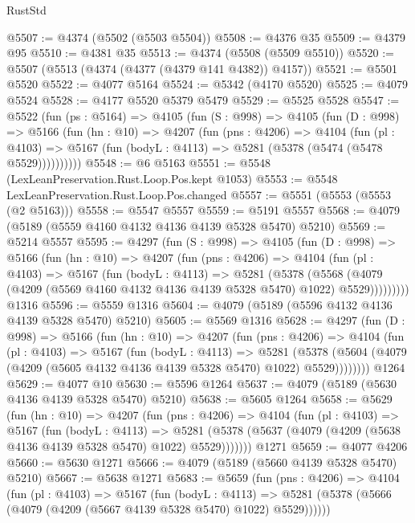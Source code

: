 \begin{lexlean}{RustStd}
\begin{coremodule}
@5507 := @4374 (@5502 (@5503 @5504))
@5508 := @4376 @35
@5509 := @4379 @95
@5510 := @4381 @35
@5513 := @4374 (@5508 (@5509 @5510))
@5520 := @5507 (@5513 (@4374 (@4377 (@4379 @141 @4382)) @4157))
@5521 := @5501 @5520
@5522 := @4077 @5164
@5524 := @5342 (@4170 @5520)
@5525 := @4079 @5524
@5528 := @4177 @5520 @5379 @5479
@5529 := @5525 @5528
@5547 := @5522
    (fun (ps : @5164) =>
    @4105
      (fun (S : @998) =>
      @4105
        (fun (D : @998) =>
        @5166
          (fun (hn : @10) =>
          @4207
            (fun (pns : @4206) =>
            @4104
              (fun (pl : @4103) =>
              @5167 (fun (bodyL : @4113) => @5281 (@5378 (@5474 (@5478 @5529))))))))))
@5548 := @6 @5163
@5551 := @5548 (LexLeanPreservation.Rust.Loop.Pos.kept @1053)
@5553 := @5548 LexLeanPreservation.Rust.Loop.Pos.changed
@5557 := @5551 (@5553 (@5553 (@2 @5163)))
@5558 := @5547 @5557
@5559 := @5191 @5557
@5568 := @4079 (@5189 (@5559 @4160 @4132 @4136 @4139 @5328 @5470) @5210)
@5569 := @5214 @5557
@5595 := @4297
    (fun (S : @998) =>
    @4105
      (fun (D : @998) =>
      @5166
        (fun (hn : @10) =>
        @4207
          (fun (pns : @4206) =>
          @4104
            (fun (pl : @4103) =>
            @5167
              (fun (bodyL : @4113) =>
              @5281
                (@5378
                  (@5568
                    (@4079 (@4209 (@5569 @4160 @4132 @4136 @4139 @5328 @5470) @1022) @5529)))))))))
    @1316
@5596 := @5559 @1316
@5604 := @4079 (@5189 (@5596 @4132 @4136 @4139 @5328 @5470) @5210)
@5605 := @5569 @1316
@5628 := @4297
    (fun (D : @998) =>
    @5166
      (fun (hn : @10) =>
      @4207
        (fun (pns : @4206) =>
        @4104
          (fun (pl : @4103) =>
          @5167
            (fun (bodyL : @4113) =>
            @5281
              (@5378 (@5604 (@4079 (@4209 (@5605 @4132 @4136 @4139 @5328 @5470) @1022) @5529))))))))
    @1264
@5629 := @4077 @10
@5630 := @5596 @1264
@5637 := @4079 (@5189 (@5630 @4136 @4139 @5328 @5470) @5210)
@5638 := @5605 @1264
@5658 := @5629
    (fun (hn : @10) =>
    @4207
      (fun (pns : @4206) =>
      @4104
        (fun (pl : @4103) =>
        @5167
          (fun (bodyL : @4113) =>
          @5281 (@5378 (@5637 (@4079 (@4209 (@5638 @4136 @4139 @5328 @5470) @1022) @5529)))))))
    @1271
@5659 := @4077 @4206
@5660 := @5630 @1271
@5666 := @4079 (@5189 (@5660 @4139 @5328 @5470) @5210)
@5667 := @5638 @1271
@5683 := @5659
    (fun (pns : @4206) =>
    @4104
      (fun (pl : @4103) =>
      @5167
        (fun (bodyL : @4113) =>
        @5281 (@5378 (@5666 (@4079 (@4209 (@5667 @4139 @5328 @5470) @1022) @5529))))))

\end{coremodule}
\end{lexlean}
